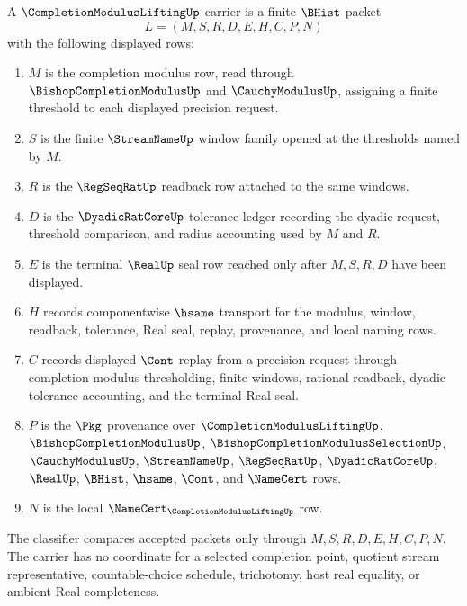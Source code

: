 \begin{definition}
\label{def:completion-modulus-lifting-carrier}
A $\CompletionModulusLiftingUp$ carrier is a finite $\BHist$ packet
$$
L=(M,S,R,D,E,H,C,P,N)
$$
with the following displayed rows:
\begin{enumerate}
\item $M$ is the completion modulus row, read through $\BishopCompletionModulusUp$ and $\CauchyModulusUp$, assigning a finite threshold to each displayed precision request.
\item $S$ is the finite $\StreamNameUp$ window family opened at the thresholds named by $M$.
\item $R$ is the $\RegSeqRatUp$ readback row attached to the same windows.
\item $D$ is the $\DyadicRatCoreUp$ tolerance ledger recording the dyadic request, threshold comparison, and radius accounting used by $M$ and $R$.
\item $E$ is the terminal $\RealUp$ seal row reached only after $M,S,R,D$ have been displayed.
\item $H$ records componentwise $\hsame$ transport for the modulus, window, readback, tolerance, Real seal, replay, provenance, and local naming rows.
\item $C$ records displayed $\Cont$ replay from a precision request through completion-modulus thresholding, finite windows, rational readback, dyadic tolerance accounting, and the terminal Real seal.
\item $P$ is the $\Pkg$ provenance over $\CompletionModulusLiftingUp$, $\BishopCompletionModulusUp$, $\BishopCompletionModulusSelectionUp$, $\CauchyModulusUp$, $\StreamNameUp$, $\RegSeqRatUp$, $\DyadicRatCoreUp$, $\RealUp$, $\BHist$, $\hsame$, $\Cont$, and $\NameCert$ rows.
\item $N$ is the local $\NameCert_{\CompletionModulusLiftingUp}$ row.
\end{enumerate}
The classifier compares accepted packets only through $M,S,R,D,E,H,C,P,N$. The carrier has no coordinate for a selected completion point, quotient stream representative, countable-choice schedule, trichotomy, host real equality, or ambient Real completeness.
\end{definition}

